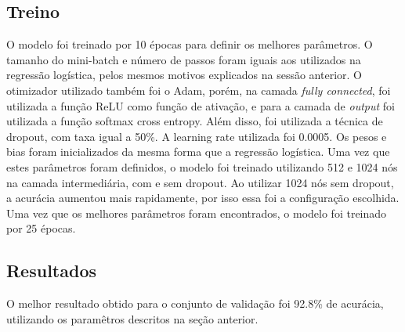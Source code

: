 \documentclass[conference]{IEEEtran}
\begin{document}
\subsection{Treino}
O modelo foi treinado por 10 épocas para definir os melhores parâmetros. O tamanho do mini-batch e número de passos foram iguais aos utilizados na regressão logística, pelos mesmos motivos explicados na sessão anterior. O otimizador utilizado também foi o Adam, porém, na camada \textit{fully connected}, foi utilizada a função ReLU como função de ativação, e para a camada de \textit{output} foi utilizada a função softmax cross entropy. Além disso, foi utilizada a técnica de dropout, com taxa igual a 50\%. A learning rate utilizada foi 0.0005. Os pesos e bias foram inicializados da mesma forma que a regressão logística. Uma vez que estes parâmetros foram definidos, o modelo foi treinado utilizando 512 e 1024 nós na camada intermediária, com e sem dropout. Ao utilizar 1024 nós sem dropout, a acurácia aumentou mais rapidamente, por isso essa foi a configuração escolhida. Uma vez que os melhores parâmetros foram encontrados, o modelo foi treinado por 25 épocas.

\subsection{Resultados}
O melhor resultado obtido para o conjunto de validação foi 92.8\% de acurácia, utilizando os paramêtros descritos na seção anterior.
\end{document}
